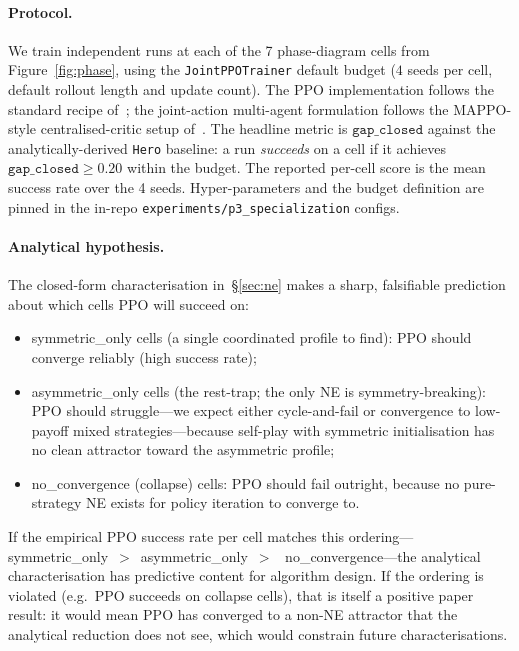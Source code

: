 \documentclass{anvil-paper}
\begin{document}
\paragraph{Protocol.}
We train independent runs at each of the 7 phase-diagram cells from
Figure~\ref{fig:phase}, using the \texttt{JointPPOTrainer} default budget
($4$ seeds per cell, default rollout length and update count). The PPO
implementation follows the standard recipe of~\citet{ppo2017}; the
joint-action multi-agent formulation follows the
MAPPO-style centralised-critic setup of~\citet{mappo2022}. The headline
metric is $\texttt{gap\_closed}$ against the analytically-derived
\texttt{Hero} baseline: a run \emph{succeeds} on a cell if it achieves
$\texttt{gap\_closed}\geq 0.20$ within the budget. The reported per-cell
score is the mean success rate over the 4 seeds. Hyper-parameters and the
budget definition are pinned in the in-repo
\texttt{experiments/p3\_specialization} configs.

\paragraph{Analytical hypothesis.}
The closed-form characterisation in~\S\ref{sec:ne} makes a sharp,
falsifiable prediction about which cells PPO will succeed on:

\begin{itemize}
  \item \textsf{symmetric\_only} cells (a single coordinated profile to
  find): PPO should converge reliably (high success rate);
  \item \textsf{asymmetric\_only} cells (the rest-trap; the only NE is
  symmetry-breaking): PPO should struggle---we expect either
  cycle-and-fail or convergence to low-payoff mixed strategies---because
  self-play with symmetric initialisation has no clean attractor toward the
  asymmetric profile;
  \item \textsf{no\_convergence} (collapse) cells: PPO should fail
  outright, because no pure-strategy NE exists for policy iteration to
  converge to.
\end{itemize}

If the empirical PPO success rate per cell matches this ordering---
\textsf{symmetric\_only}~$>$~\textsf{asymmetric\_only}~$>$~%
\textsf{no\_convergence}---the analytical characterisation has predictive
content for algorithm design. If the ordering is violated (e.g.\ PPO succeeds
on collapse cells), that is itself a positive paper result: it would mean
PPO has converged to a non-NE attractor that the analytical reduction does
not see, which would constrain future characterisations.
\end{document}
